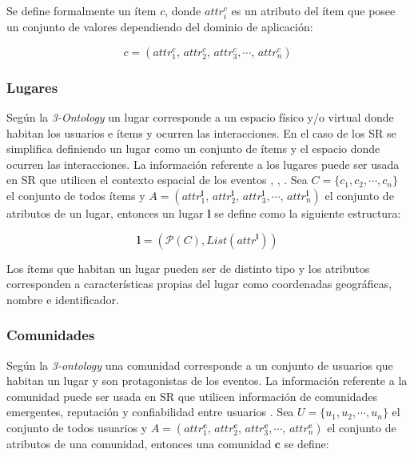Se define formalmente un ítem $c$, donde $attr_i^{c}$ es un atributo del ítem que posee un conjunto de valores dependiendo del dominio de aplicación:

\begin{equation}
\label{modelo:item}
	c = (attr_1^{c},\,attr_2^{c},\,attr_3^{c},\cdots,\,attr_n^{c})
\end{equation}

\subsubsection{Lugares}

Según la \textit{3-Ontology} un lugar corresponde a un espacio físico y/o virtual donde habitan los usuarios e ítems y ocurren las interacciones. En el caso de los SR se simplifica definiendo un lugar como un conjunto de ítems y el espacio donde ocurren las interacciones. La información referente a los lugares puede ser usada en SR que utilicen el contexto espacial de los eventos \citep{Adomavicius:2011}, \citep{Panagiotis:2011}, \citep{Bobadilla:2013}. Sea	$C = \{c_1, c_2,\cdots,c_n\}$ el conjunto de todos ítems y $A = (attr_1^{\pmb{l}},\,attr_2^{\pmb{l}},\,attr_3^{\pmb{l}},\cdots,\,attr_n^{\pmb{l}})$ el conjunto de atributos de un lugar, entonces un lugar $\pmb{l}$ se define como la siguiente estructura:

\begin{equation}
\label{modelo:lugar}
	\pmb{l} = (\mathcal{P}(C), List(attr^{\pmb{l}}))
\end{equation}

Los ítems que habitan un lugar pueden ser de distinto tipo y los atributos corresponden a características propias del lugar como coordenadas geográficas, nombre e identificador.

\subsubsection{Comunidades}

Según la \textit{3-ontology} una comunidad corresponde a un conjunto de usuarios que habitan un lugar y son protagonistas de los eventos. La información referente a la comunidad puede ser usada en SR que utilicen información de comunidades emergentes, reputación y confiabilidad entre usuarios \citep{Victor:2011}. Sea	$U = \{u_1, u_2,\cdots,u_n\}$ el conjunto de todos usuarios y $A = (attr_1^{\pmb{c}},\,attr_2^{\pmb{c}},\,attr_3^{\pmb{c}},\cdots,\,attr_n^{\pmb{c}})$ el conjunto de atributos de una comunidad, entonces una comunidad $\pmb{c}$ se define:

